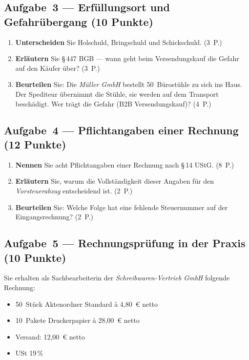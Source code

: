 \documentclass[11pt, a4paper]{article}
\begin{document}
\subsection*{Aufgabe~3 --- Erfüllungsort und Gefahrübergang (10 Punkte)}

\begin{enumerate}[label=(\alph*)]
  \item \textbf{Unterscheiden} Sie Holschuld, Bringschuld und Schickschuld. \hfill (3~P.)
  \item \textbf{Erläutern} Sie §\,447 BGB --- wann geht beim Versendungskauf die Gefahr auf den Käufer über? \hfill (3~P.)
  \item \textbf{Beurteilen} Sie: Die \emph{Müller GmbH} bestellt 50~Bürostühle zu sich ins Haus. Der Spediteur übernimmt die Stühle, sie werden auf dem Transport beschädigt. Wer trägt die Gefahr (B2B Versendungskauf)? \hfill (4~P.)
\end{enumerate}

\subsection*{Aufgabe~4 --- Pflichtangaben einer Rechnung (12 Punkte)}

\begin{enumerate}[label=(\alph*)]
  \item \textbf{Nennen} Sie acht Pflichtangaben einer Rechnung nach §\,14 UStG. \hfill (8~P.)
  \item \textbf{Erläutern} Sie, warum die Vollständigkeit dieser Angaben für den \emph{Vorsteuerabzug} entscheidend ist. \hfill (2~P.)
  \item \textbf{Beurteilen} Sie: Welche Folge hat eine fehlende Steuernummer auf der Eingangsrechnung? \hfill (2~P.)
\end{enumerate}

\subsection*{Aufgabe~5 --- Rechnungsprüfung in der Praxis (10 Punkte)}

Sie erhalten als Sachbearbeiterin der \emph{Schreibwaren-Vertrieb GmbH} folgende
Rechnung:

\begin{itemize}[itemsep=0pt]
  \item 50~Stück Aktenordner Standard à 4,80~€ netto
  \item 10~Pakete Druckerpapier à 28,00~€ netto
  \item Versand: 12,00~€ netto
  \item USt 19\,\%
\end{itemize}
\end{document}
